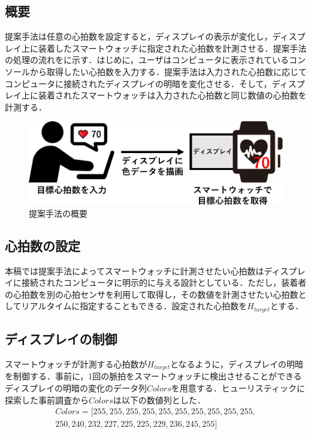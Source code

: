\documentclass[Japanese,noauthor]{dicomopapers}
\begin{document}
\subsection{概要}
\label{subsec:overview}
提案手法は任意の心拍数を設定すると，ディスプレイの表示が変化し，ディスプレイ上に装着したスマートウォッチに指定された心拍数を計測させる．提案手法の処理の流れをに示す．はじめに，ユーザはコンピュータに表示されているコンソールから取得したい心拍数を入力する．提案手法は入力された心拍数に応じてコンピュータに接続されたディスプレイの明暗を変化させる．そして，ディスプレイ上に装着されたスマートウォッチは入力された心拍数と同じ数値の心拍数を計測する．\par

\begin{figure}[!t]
  \centering
  \includegraphics[width=1\linewidth]{figures/method.eps}
  \caption{提案手法の概要}
  \label{fig:method}
\end{figure}

\subsection{心拍数の設定}
本稿では提案手法によってスマートウォッチに計測させたい心拍数はディスプレイに接続されたコンピュータに明示的に与える設計としている．ただし，装着者の心拍数を別の心拍センサを利用して取得し，その数値を計測させたい心拍数としてリアルタイムに指定することもできる．設定された心拍数を$H_{target}$とする．

\subsection{ディスプレイの制御}
スマートウォッチが計測する心拍数が$H_{target}$となるように，ディスプレイの明暗を制御する．事前に，1回の脈拍をスマートウォッチに検出させることができるディスプレイの明暗の変化のデータ列$Colors$を用意する．ヒューリスティックに探索した事前調査から$Colors$は以下の数値列とした．
\begin{equation*}
  \begin{split}
    Colors = [255, 255, 255, 255, 255, 255, 255, 255, 255, 255,\\250, 240, 232, 227, 225, 225, 229, 236, 245, 255]
  \end{split}
\end{equation*}
\end{document}
